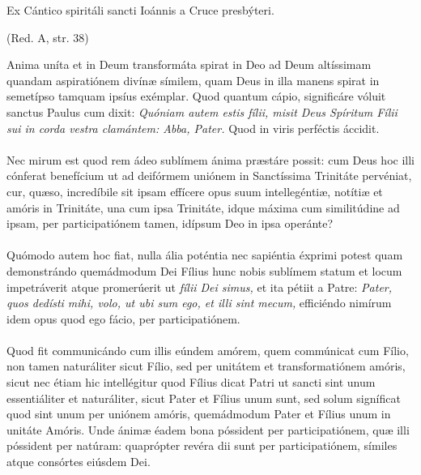 \documentclass[options]{article}
\begin{document}
	Ex Cántico spiritáli sancti Ioánnis a Cruce presbýteri.
	\begin{flushright}
		(Red. A, str. 38)
	\end{flushright} 
Anima uníta et in Deum transformáta spirat in Deo ad Deum altíssimam quandam aspiratiónem divínæ símilem, quam Deus in illa manens spirat in semetípso tamquam ipsíus exémplar. Quod quantum cápio, significáre vóluit sanctus Paulus cum dixit: 
\emph{Quóniam autem estis fílii, misit Deus Spíritum Fílii sui in corda vestra clamántem: Abba, Pater.}
Quod in viris perféctis áccidit.\\\\
 Nec mirum est quod rem ádeo sublímem ánima præstáre possit: cum Deus hoc illi cónferat benefícium ut ad deifórmem uniónem in Sanctíssima Trinitáte pervéniat, cur, quæso, incredíbile sit ipsam effícere opus suum intellegéntiæ, notítiæ et amóris in Trinitáte, una cum ipsa Trinitáte, idque máxima cum similitúdine ad ipsam, per participatiónem tamen, idípsum Deo in ipsa operánte?\\\\
  Quómodo autem hoc fiat, nulla ália poténtia nec sapiéntia éxprimi potest quam demonstrándo quemádmodum Dei Fílius hunc nobis sublímem statum et locum impetráverit atque promerúerit ut \emph{fílii Dei simus,} et ita pétiit a Patre: \emph{Pater, quos dedísti mihi, volo, ut ubi sum ego, et illi sint mecum,} efficiéndo nimírum idem opus quod ego fácio, per participatiónem.\\\\
     Quod fit communicándo cum illis eúndem amórem, quem commúnicat cum Fílio, non tamen naturáliter sicut Fílio, sed per unitátem et transformatiónem amóris, sicut nec étiam hic intellégitur quod Fílius dicat Patri ut sancti sint unum essentiáliter et naturáliter, sicut Pater et Fílius unum sunt, sed solum signíficat quod sint unum per uniónem amóris, quemádmodum Pater et Fílius unum in unitáte Amóris. Unde ánimæ éadem bona póssident per participatiónem, quæ illi póssident per natúram: quaprópter revéra dii sunt per participatiónem, símiles atque consórtes eiúsdem Dei. 
     
 
\end{document}
